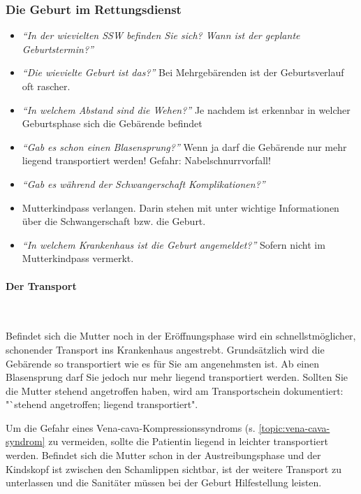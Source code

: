 \subsubsection{Die Geburt im Rettungsdienst}


\begin{itemize}
    \item \emph{"`In der wievielten SSW befinden Sie
    sich? Wann ist der geplante Geburtstermin?"'} 
	\item \emph{"`Die wievielte Geburt ist das?"'} Bei
	Mehrgebärenden ist der Geburtsverlauf oft rascher.
	\item \emph{"`In welchem Abstand sind die Wehen?"'} Je
	nachdem ist erkennbar in welcher Geburtsphase sich die Gebärende befindet
	\item \emph{"`Gab es schon einen Blasensprung?"'} Wenn ja
	darf die Gebärende nur mehr liegend transportiert werden! Gefahr: Nabelschnurrvorfall!
	\item \emph{"`Gab es während der Schwangerschaft
	Komplikationen?"'}
	\item Mutterkindpass verlangen. Darin stehen mit
	unter wichtige Informationen über die Schwangerschaft bzw. die  Geburt.
	\item \emph{"`In welchem Krankenhaus ist die Geburt
	angemeldet?"'} Sofern nicht im Mutterkindpass vermerkt.
\end{itemize}

\paragraph{Der Transport}~

Befindet sich die Mutter noch in der Eröffnungsphase wird ein schnellstmöglicher,
schonender Transport ins Krankenhaus angestrebt. Grundsätzlich wird die Gebärende
so transportiert wie es für Sie am angenehmsten ist. Ab einen Blasensprung darf
Sie jedoch nur mehr liegend transportiert werden. Sollten Sie die Mutter stehend
angetroffen haben, wird am Transportschein dokumentiert: "`stehend angetroffen;
liegend transportiert". 

Um die Gefahr eines Vena-cava-Kompressionssyndroms (s.
\ref{topic:vena-cava-syndrom} zu vermeiden, sollte die
Patientin liegend in leichter 
transportiert werden. Befindet sich die Mutter schon in der Austreibungsphase und der Kindskopf ist zwischen den Schamlippen sichtbar, ist der weitere Transport zu
unterlassen und die Sanitäter müssen bei der Geburt Hilfestellung leisten. 

